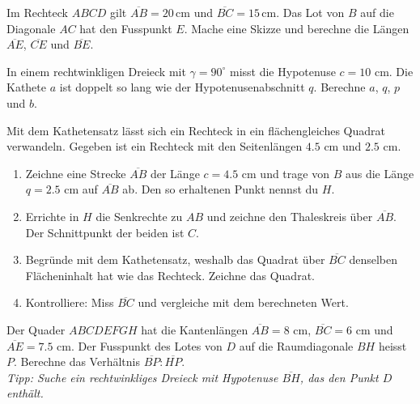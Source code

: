 \documentclass[11pt,oneside]{article}
\begin{document}
\begin{aufgabe} %
	Im Rechteck $ABCD$ gilt $\overline{AB}=20$\,cm und $\overline{BC}=15$\,cm. Das Lot von $B$ auf die Diagonale $AC$ hat den Fusspunkt $E$. Mache eine Skizze und berechne die Längen $\overline{AE}$, $\overline{CE}$ und $\overline{BE}$.\par
\end{aufgabe}

\begin{aufgabe}
	In einem rechtwinkligen Dreieck mit $\gamma=90^\circ$ misst die Hypotenuse $c=10$ cm. Die Kathete $a$ ist doppelt so lang wie der Hypotenusenabschnitt $q$. Berechne $a$, $q$, $p$ und $b$.\par
\end{aufgabe}

\begin{aufgabe} %
	Mit dem Kathetensatz lässt sich ein Rechteck in ein flächengleiches Quadrat verwandeln. Gegeben ist ein Rechteck mit den Seitenlängen $4.5$ cm und $2.5$ cm.
	\begin{enumerate}[label=\alph*)]
		\item Zeichne eine Strecke $\overline{AB}$ der Länge $c=4.5$ cm und trage von $B$ aus die Länge $q=2.5$ cm auf $\overline{AB}$ ab. Den so erhaltenen Punkt nennst du $H$.
		\item Errichte in $H$ die Senkrechte zu $AB$ und zeichne den Thaleskreis über $\overline{AB}$. Der Schnittpunkt der beiden ist $C$.
		\item Begründe mit dem Kathetensatz, weshalb das Quadrat über $\overline{BC}$ denselben Flächeninhalt hat wie das Rechteck. Zeichne das Quadrat.
		\item Kontrolliere: Miss $\overline{BC}$ und vergleiche mit dem berechneten Wert.
	\end{enumerate}
\end{aufgabe}

\begin{aufgabe} %
	Der Quader $ABCDEFGH$ hat die Kantenlängen $\overline{AB}=8$ cm, $\overline{BC}=6$ cm und $\overline{AE}=7.5$ cm. Der Fusspunkt des Lotes von $D$ auf die Raumdiagonale $BH$ heisst $P$. Berechne das Verhältnis $\overline{BP}:\overline{HP}$.\\
	\textit{Tipp: Suche ein rechtwinkliges Dreieck mit Hypotenuse $\overline{BH}$, das den Punkt $D$ enthält.}\par
\end{aufgabe}
\end{document}
